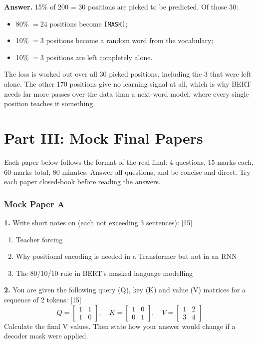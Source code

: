 \documentclass[11pt]{article}
\begin{document}
\textbf{Answer.} 15\% of 200 = 30 positions are picked to be predicted. Of those 30:

\begin{itemize}
  \item 80\% $=24$ positions become \texttt{[MASK]};
  \item 10\% $=3$ positions become a random word from the vocabulary;
  \item 10\% $=3$ positions are left completely alone.
\end{itemize}

The loss is worked out over all 30 picked positions, including the 3 that were left alone. The
other 170 positions give no learning signal at all, which is why BERT needs far more passes
over the data than a next-word model, where every single position teaches it something.

\newpage
\part*{Part III: Mock Final Papers}

Each paper below follows the format of the real final: 4 questions, 15 marks each, 60 marks
total, 80 minutes. Answer all questions, and be concise and direct. Try each paper closed-book
before reading the answers.

\section{Mock Paper A}

\textbf{1.} Write short notes on (each not exceeding 3 sentences): \hfill [15]
\begin{enumerate}[label=\alph*.]
  \item Teacher forcing
  \item Why positional encoding is needed in a Transformer but not in an RNN
  \item The 80/10/10 rule in BERT's masked language modelling
\end{enumerate}

\textbf{2.} You are given the following query (Q), key (K) and value (V) matrices for a
sequence of 2 tokens: \hfill [15]
\[
Q=\begin{bmatrix}1 & 1\\ 1 & 0\end{bmatrix},\quad
K=\begin{bmatrix}1 & 0\\ 0 & 1\end{bmatrix},\quad
V=\begin{bmatrix}1 & 2\\ 3 & 4\end{bmatrix}
\]
Calculate the final V values. Then state how your answer would change if a decoder mask were
applied.
\end{document}
